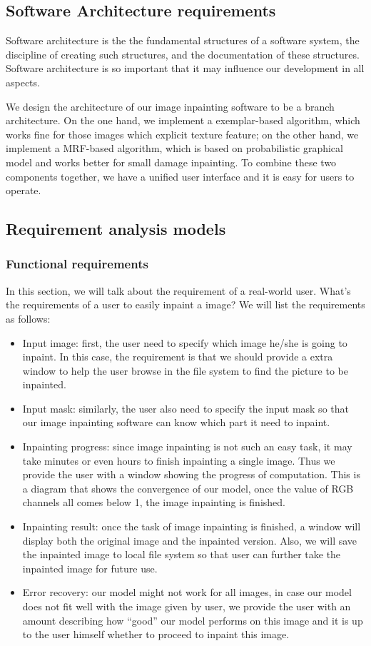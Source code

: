 \subsection{Software Architecture requirements}
Software architecture is the  the fundamental structures of a software system, the discipline of creating such structures, and the documentation of these structures. Software architecture is so important that it may influence our development in all aspects.

We design the architecture of our image inpainting software to be a branch architecture. On the one hand, we implement a exemplar-based algorithm, which works fine for those images which explicit texture feature; on the other hand, we implement a MRF-based algorithm, which is based on probabilistic graphical model and works better for small damage inpainting. To combine these two components together, we have a unified user interface and it is easy for users to operate.

\subsection{Requirement analysis models}
\subsubsection{Functional requirements}
In this section, we will talk about the requirement of a real-world user. What's the requirements of a user to easily inpaint a image? We will list the requirements as follows:
\begin{itemize}
\item Input image: first, the user need to specify which image he/she is going to inpaint. In this case, the requirement is that we should provide a extra window to help the user browse in the file system to find the picture to be inpainted.
\item Input mask: similarly, the user also need to specify the input mask so that our image inpainting software can know which part it need to inpaint.
\item Inpainting progress: since image inpainting is not such an easy task, it may take minutes or even hours to finish inpainting a single image. Thus we provide the user with a window showing the progress of computation. This is a diagram that shows the convergence of our model, once the value of RGB channels all comes below 1, the image inpainting is finished.
\item Inpainting result: once the task of image inpainting is finished, a window will display both the original image and the inpainted version. Also, we will save the inpainted image to local file system so that user can further take the inpainted image for future use.
\item Error recovery: our model might not work for all images, in case our model does not fit well with the image given by user, we provide the user with an amount describing how ``good'' our model performs on this image and it is up to the user himself whether to proceed to inpaint this image.
\end{itemize}
